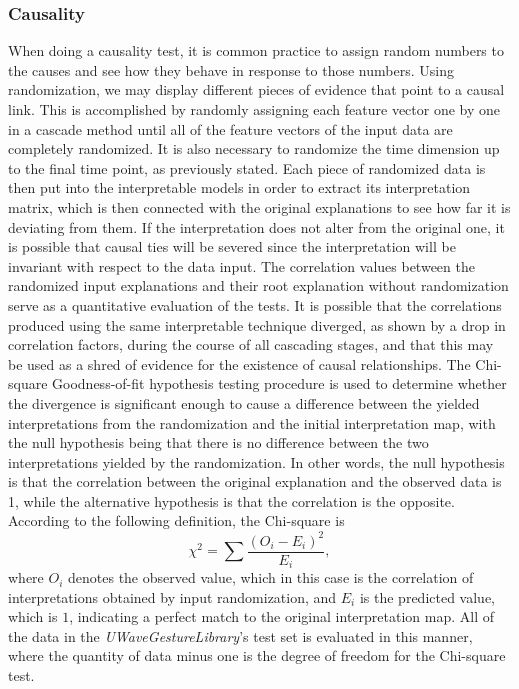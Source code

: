 \documentclass{svproc}
\begin{document}
\subsubsection{Causality}

When doing a causality test, it is common practice to assign random numbers to the causes and see how they behave in response to those numbers. Using randomization, we may display different pieces of evidence that point to a causal link. This is accomplished by randomly assigning each feature vector one by one in a cascade method until all of the feature vectors of the input data are completely randomized. It is also necessary to randomize the time dimension up to the final time point, as previously stated. Each piece of randomized data is then put into the interpretable models in order to extract its interpretation matrix, which is then connected with the original explanations to see how far it is deviating from them. If the interpretation does not alter from the original one, it is possible that causal ties will be severed since the interpretation will be invariant with respect to the data input. The correlation values between the randomized input explanations and their root explanation without randomization serve as a quantitative evaluation of the tests. It is possible that the correlations produced using the same interpretable technique diverged, as shown by a drop in correlation factors, during the course of all cascading stages, and that this may be used as a shred of evidence for the existence of causal relationships. The Chi-square Goodness-of-fit hypothesis testing procedure is used to determine whether the divergence is significant enough to cause a difference between the yielded interpretations from the randomization and the initial interpretation map, with the null hypothesis being that there is no difference between the two interpretations yielded by the randomization. In other words, the null hypothesis is that the correlation between the original explanation and the observed data is 1, while the alternative hypothesis is that the correlation is the opposite. According to the following definition, the Chi-square is
\begin{equation}
\chi^2 = \sum \frac{(O_i - E_i)^2}{E_i},
\label{eq:chisquare}
\end{equation}
where $O_i$ denotes the observed value, which in this case is the correlation of interpretations obtained by input randomization, and $E_i$ is the predicted value, which is $1$, indicating a perfect match to the original interpretation map. All of the data in the \textit{UWaveGestureLibrary}'s test set is evaluated in this manner, where the quantity of data minus one is the degree of freedom for the Chi-square test.
\end{document}
